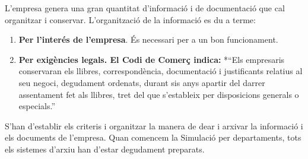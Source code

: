 \documentclass[
]{book}
\begin{document}
L'empresa genera una gran quantitat d'informació i de documentació que cal organitzar i conservar. L'organització de la informació es du a terme:

\begin{enumerate}
\def\labelenumi{\alph{enumi}.}
\item
  \textbf{Per l'interés de l'empresa}. És necessari per a un bon funcionament.
\item
  \textbf{Per exigències legals. El Codi de Comerç indica:} *``Els empresaris conservaran els llibres, correspondència, documentació i justificants relatius al seu negoci, degudament ordenats, durant sis anys apartir del darrer assentament fet als llibres, tret del que s'estableix per disposicions generals o especials.''
\end{enumerate}

S'han d'establir els criteris i organitzar la manera de dear i arxivar la informació i els documents de l'empresa. Quan comencem la Simulació per departaments, tots els sistemes d'arxiu han d'estar degudament preparats.
\end{document}

